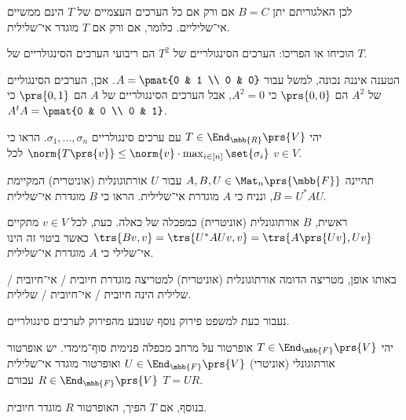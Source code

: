 \documentclass[a4paper,10pt,twoside,openany]{book}
\begin{document}
לכן האלגוריתם יתן
$B = C$
אם ורק אם כל הערכים העצמיים של
$T$
הינם ממשיים אי־שליליים. כלומר, אם ורק אם
$T$
מוגדר אי־שלילית.

\begin{exercisechap}
הוכיחו או הפריכו: הערכים הסינגולריים של
$T^2$
הם ריבועי הערכים הסינגולריים של
$T$.
\end{exercisechap}

\begin{solution}
הטענה איננה נכונה, למשל עבור
$A = \pmat{0 & 1 \\ 0 & 0}$.
אכן, הערכים הסינגוליים של
$A^2$
הם
$\prs{0,0}$
כי
$A^2 = 0$,
אבל הערכים הסינגולריים של
$A$
הם
$\prs{0,1}$
כי
$A^t A = \pmat{0 & 0 \\ 0 & 1}$.
\end{solution}

\begin{exercisechap}
יהי
$T \in \End_{\mbb{R}}\prs{V}$
עם ערכים סינגולריים
$\sigma_1, \ldots, \sigma_n$.
הראו כי
$\norm{T\prs{v}} \leq \norm{v} \cdot \max_{i \in [n]} \set{\sigma_i}$
לכל
$v \in V$.
\end{exercisechap}

\begin{exercisechap}
תהיינה
$A,B,U \in \Mat_n\prs{\mbb{F}}$
עבור
$U$
אורתוגונלית (אוניטרית) המקיימת
$B = U^* A U$,
ונניח כי
$A$
מוגדרת אי־שלילית.
הראו כי
$B$
מוגדרת אי־שלילית.
\end{exercisechap}

\begin{solution}
ראשית,
$B$
אורתוגונלית (אוניטרית) כמפכלה של כאלה.
כעת, לכל
$v \in V$
מתקיים
$\trs{Bv, v} = \trs{U^* A U v, v} = \trs{A \prs{U v}, U v}$
כאשר ביטוי זה הינו אי־שלילי כי
$A$
מוגדרת אי־שלילית.
\end{solution}

\begin{remark}
באותו אופן, מטריצה הדומה אורתוגונלית (אוניטרית) למטריצה מוגדרת
חיובית%
\slash%
אי־חיובית%
\slash%
שלילית הינה
חיובית%
\slash%
אי־חיובית%
\slash%
שלילית.
\end{remark}

נעבור כעת למשפט פירוק נוסף שנובע מהפירוק לערכים סינגולריים.

\begin{theorem}
יהי
$T \in \End_{\mbb{F}}\prs{V}$
אופרטור על מרחב מכפלה פנימית סוף־מימדי. יש אופרטור אורתוגונלי (אוניטרי)
$U \in \End_{\mbb{F}}\prs{V}$
ואופרטור מוגדר אי־שלילית
$R \in \End_{\mbb{F}}\prs{V}$
עבורם
$T = UR$.

בנוסף, אם
$T$
הפיך, האופרטור
$R$
מוגדר חיובית.
\end{theorem}
\end{document}
